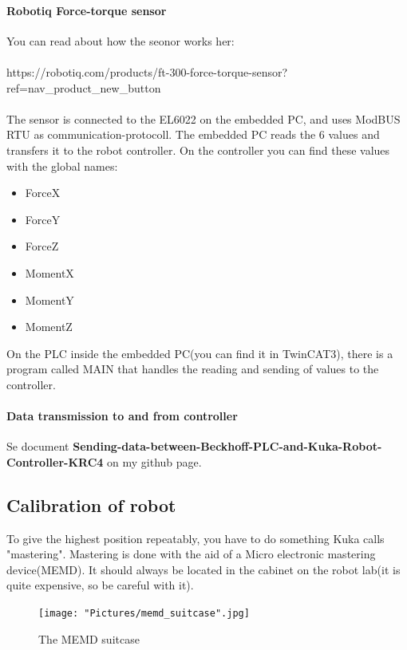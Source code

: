 \documentclass{article}
\begin{document}
        \newpage
        
        \paragraph{Robotiq Force-torque sensor}
        You can read about how the seonor works her:\\\\ https://robotiq.com/products/ft-300-force-torque-sensor?ref=nav\_product\_new\_button
        \\\\
        The sensor is connected to the EL6022 on the embedded PC, and uses ModBUS RTU as communication-protocoll. The embedded PC reads the 6 values and transfers it to the robot controller. On the controller you can find these values with the global names:
        \begin{itemize}
            \item ForceX
            \item ForceY
            \item ForceZ
            \item MomentX
            \item MomentY
            \item MomentZ
        \end{itemize}
        
        On the PLC inside the embedded PC(you can find it in TwinCAT3), there is a program called MAIN that handles the reading and sending of values to the controller. 
        
        \paragraph{Data transmission to and from controller}
        Se document \textbf{Sending-data-between-Beckhoff-PLC-and-Kuka-Robot-Controller-KRC4} on my github page. 

\newpage

    \subsection{Calibration of robot}
        To give the highest position repeatably, you have to do something Kuka calls "mastering". Mastering is done with the aid of a Micro electronic mastering device(MEMD). It should always be located in the cabinet on the robot lab(it is quite expensive, so be careful with it). 
        
        \begin{figure}[!h]
            \centering
            \texttt{[image: "Pictures/memd\_suitcase".jpg]}
            \caption{The MEMD suitcase}
        \end{figure}
        
\end{document}
